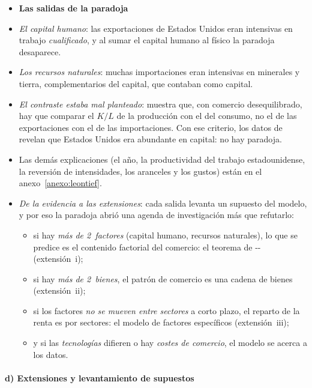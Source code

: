 \documentclass[11pt]{article}
\begin{document}
\begin{itemize}
\item[] \textbf{Las salidas de la paradoja}

\item \emph{El capital humano}: las exportaciones de Estados Unidos eran intensivas en trabajo \emph{cualificado}\nocite{Keesing1966Labor}, y al sumar el capital humano al físico la paradoja desaparece\nocite{Kenen1965Nature}.
\item \emph{Los recursos naturales}: muchas importaciones eran intensivas en minerales y tierra, complementarios del capital, que contaban como capital\nocite{Vanek1963Natural}.
\item \emph{El contraste estaba mal planteado}: \textcite{Leamer1980Leontief} muestra que, con comercio desequilibrado, hay que comparar el $K/L$ de la producción con el del consumo, no el de las exportaciones con el de las importaciones. Con ese criterio, los datos de  revelan que Estados Unidos era abundante en capital: no hay paradoja.
\item Las demás explicaciones (el año, la productividad del trabajo estadounidense, la reversión de intensidades, los aranceles y los gustos) están en el anexo~\ref{anexo:leontief}.
\item \emph{De la evidencia a las extensiones}: cada salida levanta un supuesto del modelo, y por eso la paradoja abrió una agenda de investigación más que refutarlo:
  \begin{itemize}
  \item si hay \emph{más de 2~factores} (capital humano, recursos naturales), lo que se predice es el contenido factorial del comercio: el teorema de -- (extensión~i);
  \item si hay \emph{más de 2~bienes}, el patrón de comercio es una cadena de bienes (extensión~ii);
  \item si los factores \emph{no se mueven entre sectores} a corto plazo, el reparto de la renta es por sectores: el modelo de factores específicos (extensión~iii);
  \item y si las \emph{tecnologías} difieren o hay \emph{costes de comercio}, el modelo se acerca a los datos.
  \end{itemize}
\end{itemize}

\paragraph{d) Extensiones y levantamiento de supuestos}
\end{document}
